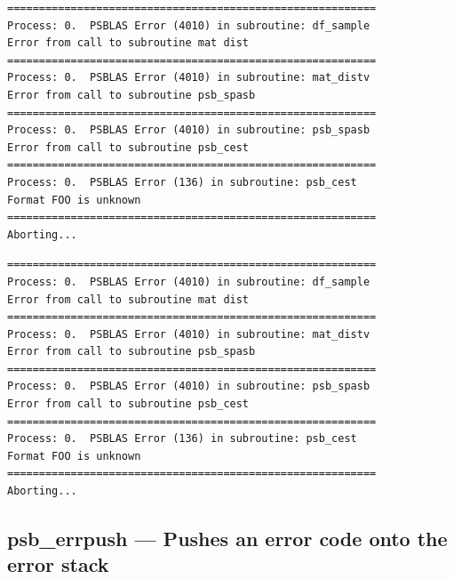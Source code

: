 \begin{listing}[h!]
\ifpdf
\begin{verbatim}
==========================================================
Process: 0.  PSBLAS Error (4010) in subroutine: df_sample           
Error from call to subroutine mat dist            
==========================================================
Process: 0.  PSBLAS Error (4010) in subroutine: mat_distv           
Error from call to subroutine psb_spasb           
==========================================================
Process: 0.  PSBLAS Error (4010) in subroutine: psb_spasb           
Error from call to subroutine psb_cest            
==========================================================
Process: 0.  PSBLAS Error (136) in subroutine: psb_cest            
Format FOO is unknown
==========================================================
Aborting...
\end{verbatim}
\else	
  \begin{Sbox}
    \begin{minipage}[tl]{0.95\textwidth}
\begin{verbatim}
==========================================================
Process: 0.  PSBLAS Error (4010) in subroutine: df_sample           
Error from call to subroutine mat dist            
==========================================================
Process: 0.  PSBLAS Error (4010) in subroutine: mat_distv           
Error from call to subroutine psb_spasb           
==========================================================
Process: 0.  PSBLAS Error (4010) in subroutine: psb_spasb           
Error from call to subroutine psb_cest            
==========================================================
Process: 0.  PSBLAS Error (136) in subroutine: psb_cest            
Format FOO is unknown
==========================================================
Aborting...
\end{verbatim}
    \end{minipage}
  \end{Sbox}
  \setlength{\fboxsep}{8pt}
  \begin{center}
    \fbox{\TheSbox}
  \end{center}
\fi
  \caption{\label{fig:errormsg}A sample PSBLAS error
    message. Process 0 detected an error condition inside the {\textrm
    psb\_cest} subroutine}
\end{listing}


\clearpage\subsection{psb\_errpush --- Pushes an error code onto the error
  stack}


